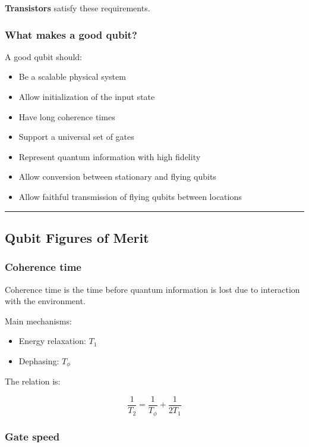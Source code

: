 \documentclass[
]{article}
\providecommand{\tightlist}{%
  \setlength{\itemsep}{0pt}\setlength{\parskip}{0pt}}
\begin{document}
\textbf{Transistors} satisfy these requirements.

\subsubsection{What makes a good qubit?}\label{what-makes-a-good-qubit}

A good qubit should:

\begin{itemize}
\tightlist
\item
  Be a scalable physical system
\item
  Allow initialization of the input state
\item
  Have long coherence times
\item
  Support a universal set of gates
\item
  Represent quantum information with high fidelity
\item
  Allow conversion between stationary and flying qubits
\item
  Allow faithful transmission of flying qubits between locations
\end{itemize}

\begin{center}\rule{0.5\linewidth}{0.5pt}\end{center}

\subsection{Qubit Figures of Merit}\label{qubit-figures-of-merit}

\subsubsection{Coherence time}\label{coherence-time}

Coherence time is the time before quantum information is lost due to
interaction with the environment.

Main mechanisms:

\begin{itemize}
\tightlist
\item
  Energy relaxation: $T_1$
\item
  Dephasing: $T_\phi$
\end{itemize}

The relation is:

\[
\frac{1}{T_2} = \frac{1}{T_\phi} + \frac{1}{2T_1}
\]

\subsubsection{Gate speed}\label{gate-speed}
\end{document}
